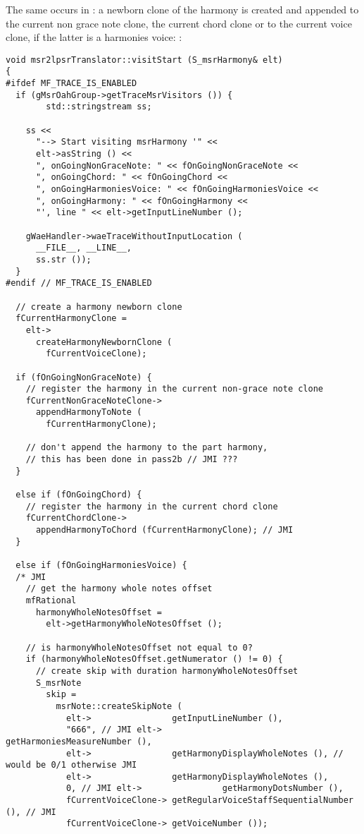 The same occurs in : a newborn clone of the harmony is created and appended to the current non grace note clone, the current chord clone or to the current voice clone, if the latter is a harmonies voice: %
:
\begin{lstlisting}[language=CPlusPlus]
void msr2lpsrTranslator::visitStart (S_msrHarmony& elt)
{
#ifdef MF_TRACE_IS_ENABLED
  if (gMsrOahGroup->getTraceMsrVisitors ()) {
		std::stringstream ss;

    ss <<
      "--> Start visiting msrHarmony '" <<
      elt->asString () <<
      ", onGoingNonGraceNote: " << fOnGoingNonGraceNote <<
      ", onGoingChord: " << fOnGoingChord <<
      ", onGoingHarmoniesVoice: " << fOnGoingHarmoniesVoice <<
      ", onGoingHarmony: " << fOnGoingHarmony <<
      "', line " << elt->getInputLineNumber ();

    gWaeHandler->waeTraceWithoutInputLocation (
      __FILE__, __LINE__,
      ss.str ());
  }
#endif // MF_TRACE_IS_ENABLED

  // create a harmony newborn clone
  fCurrentHarmonyClone =
    elt->
      createHarmonyNewbornClone (
        fCurrentVoiceClone);

  if (fOnGoingNonGraceNote) {
    // register the harmony in the current non-grace note clone
    fCurrentNonGraceNoteClone->
      appendHarmonyToNote (
        fCurrentHarmonyClone);

    // don't append the harmony to the part harmony,
    // this has been done in pass2b // JMI ???
  }

  else if (fOnGoingChord) {
    // register the harmony in the current chord clone
    fCurrentChordClone->
      appendHarmonyToChord (fCurrentHarmonyClone); // JMI
  }

  else if (fOnGoingHarmoniesVoice) {
  /* JMI
    // get the harmony whole notes offset
    mfRational
      harmonyWholeNotesOffset =
        elt->getHarmonyWholeNotesOffset ();

    // is harmonyWholeNotesOffset not equal to 0?
    if (harmonyWholeNotesOffset.getNumerator () != 0) {
      // create skip with duration harmonyWholeNotesOffset
      S_msrNote
        skip =
          msrNote::createSkipNote (
            elt->                getInputLineNumber (),
            "666", // JMI elt->                getHarmoniesMeasureNumber (),
            elt->                getHarmonyDisplayWholeNotes (), // would be 0/1 otherwise JMI
            elt->                getHarmonyDisplayWholeNotes (),
            0, // JMI elt->                getHarmonyDotsNumber (),
            fCurrentVoiceClone-> getRegularVoiceStaffSequentialNumber (), // JMI
            fCurrentVoiceClone-> getVoiceNumber ());


\end{lstlisting}
